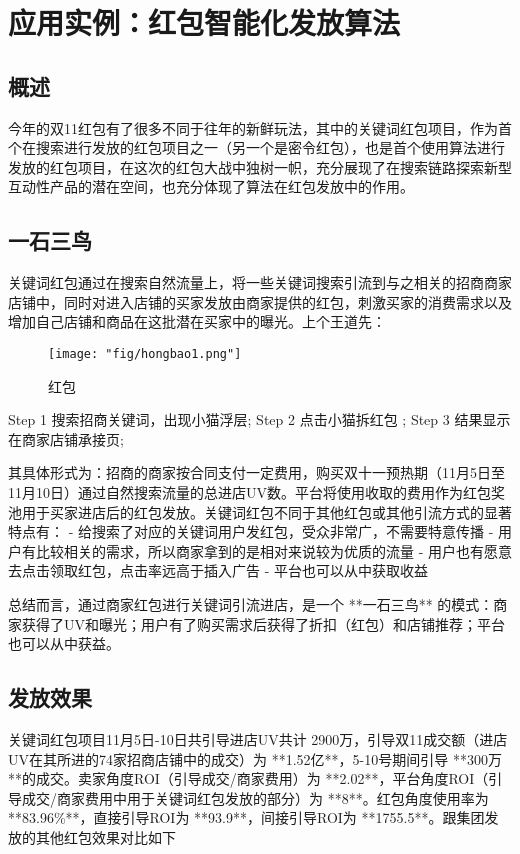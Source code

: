 \section{应用实例：红包智能化发放算法} 

\subsection{概述}
今年的双11红包有了很多不同于往年的新鲜玩法，其中的关键词红包项目，作为首个在搜索进行发放的红包项目之一（另一个是密令红包），也是首个使用算法进行发放的红包项目，在这次的红包大战中独树一帜，充分展现了在搜索链路探索新型互动性产品的潜在空间，也充分体现了算法在红包发放中的作用。

\subsection{一石三鸟}
关键词红包通过在搜索自然流量上，将一些关键词搜索引流到与之相关的招商商家店铺中，同时对进入店铺的买家发放由商家提供的红包，刺激买家的消费需求以及增加自己店铺和商品在这批潜在买家中的曝光。上个王道先：

\begin{figure}[!h]
	\centering
	\texttt{[image: "fig/hongbao1.png"]}
	\caption{红包}
	\label{fig:hongbao1}
\end{figure}

Step 1 搜索招商关键词，出现小猫浮层;
Step 2 点击小猫拆红包 ;
Step 3 结果显示在商家店铺承接页;

其具体形式为：招商的商家按合同支付一定费用，购买双十一预热期（11月5日至11月10日）通过自然搜索流量的总进店UV数。平台将使用收取的费用作为红包奖池用于买家进店后的红包发放。关键词红包不同于其他红包或其他引流方式的显著特点有：
- 给搜索了对应的关键词用户发红包，受众非常广，不需要特意传播
- 用户有比较相关的需求，所以商家拿到的是相对来说较为优质的流量
- 用户也有愿意去点击领取红包，点击率远高于插入广告
- 平台也可以从中获取收益

总结而言，通过商家红包进行关键词引流进店，是一个 **一石三鸟** 的模式：商家获得了UV和曝光；用户有了购买需求后获得了折扣（红包）和店铺推荐；平台也可以从中获益。

\subsection{发放效果}
关键词红包项目11月5日-10日共引导进店UV共计 2900万，引导双11成交额（进店UV在其所进的74家招商店铺中的成交）为 **1.52亿**，5-10号期间引导 **300万**的成交。卖家角度ROI（引导成交/商家费用）为 **2.02**，平台角度ROI（引导成交/商家费用中用于关键词红包发放的部分）为 **8**。红包角度使用率为 **83.96\%**，直接引导ROI为 **93.9**，间接引导ROI为 **1755.5**。跟集团发放的其他红包效果对比如下

